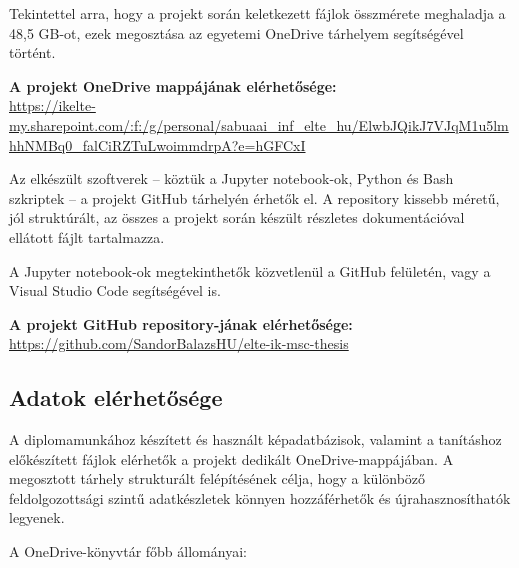         Tekintettel arra, hogy a projekt során keletkezett fájlok összmérete meghaladja a 48,5 GB-ot, ezek megosztása az egyetemi OneDrive tárhelyem segítségével történt.
        
        \vspace{0.5em}
        \noindent\textbf{A projekt OneDrive mappájának elérhetősége:} \\
        \url{https://ikelte-my.sharepoint.com/:f:/g/personal/sabuaai\_inf\_elte\_hu/ElwbJQikJ7VJqM1u5lmhhNMBq0\_falCiRZTuLwoimmdrpA?e=hGFCxI}
        
        \vspace{1em}
        Az elkészült szoftverek – köztük a Jupyter notebook-ok, Python és Bash szkriptek – a projekt GitHub tárhelyén érhetők el. A repository kissebb méretű, jól struktúrált, az összes a projekt során készült részletes dokumentációval ellátott fájlt tartalmazza.
        
        \begin{note}
        A Jupyter notebook-ok megtekinthetők közvetlenül a GitHub felületén, vagy a Visual Studio Code segítségével is.
        \end{note}
        
        \vspace{0.5em}
        \noindent\textbf{A projekt GitHub repository-jának elérhetősége:} \\
        \url{https://github.com/SandorBalazsHU/elte-ik-msc-thesis}        

        \subsection{Adatok elérhetősége}

        A diplomamunkához készített és használt képadatbázisok, valamint a tanításhoz előkészített fájlok elérhetők a projekt dedikált OneDrive-mappájában. A megosztott tárhely strukturált felépítésének célja, hogy a különböző feldolgozottsági szintű adatkészletek könnyen hozzáférhetők és újrahasznosíthatók legyenek.
        
        A OneDrive-könyvtár főbb állományai:
        
